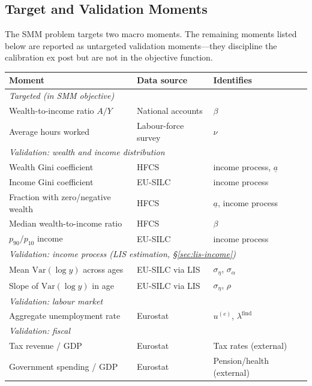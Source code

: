 \subsection{Target and Validation Moments}\label{sec:targets}

The SMM problem targets two macro moments. The remaining moments listed below are reported as untargeted validation moments---they discipline the calibration ex post but are not in the objective function.

\begin{table}[H]
\centering
\small
\begin{tabular}{lll}
\toprule
Moment & Data source & Identifies \\
\midrule
\multicolumn{3}{l}{\textit{Targeted (in SMM objective)}} \\
Wealth-to-income ratio $A/Y$ & National accounts & $\beta$ \\
Average hours worked & Labour-force survey & $\nu$ \\
\midrule
\multicolumn{3}{l}{\textit{Validation: wealth and income distribution}} \\
Wealth Gini coefficient & HFCS & income process, $\underline{a}$ \\
Income Gini coefficient & EU-SILC & income process \\
Fraction with zero/negative wealth & HFCS & $\underline{a}$, income process \\
Median wealth-to-income ratio & HFCS & $\beta$ \\
$p_{90}/p_{10}$ income & EU-SILC & income process \\
\midrule
\multicolumn{3}{l}{\textit{Validation: income process (LIS estimation, \S\ref{sec:lis-income})}} \\
Mean $\mathrm{Var}(\log y)$ across ages & EU-SILC via LIS & $\sigma_\eta$, $\sigma_\alpha$ \\
Slope of $\mathrm{Var}(\log y)$ in age & EU-SILC via LIS & $\sigma_\eta$, $\rho$ \\
\midrule
\multicolumn{3}{l}{\textit{Validation: labour market}} \\
Aggregate unemployment rate & Eurostat & $u^{(e)}$, $\lambda^{\text{find}}$ \\
\midrule
\multicolumn{3}{l}{\textit{Validation: fiscal}} \\
Tax revenue / GDP & Eurostat & Tax rates (external) \\
Government spending / GDP & Eurostat & Pension/health (external) \\
\bottomrule
\end{tabular}
\end{table}

